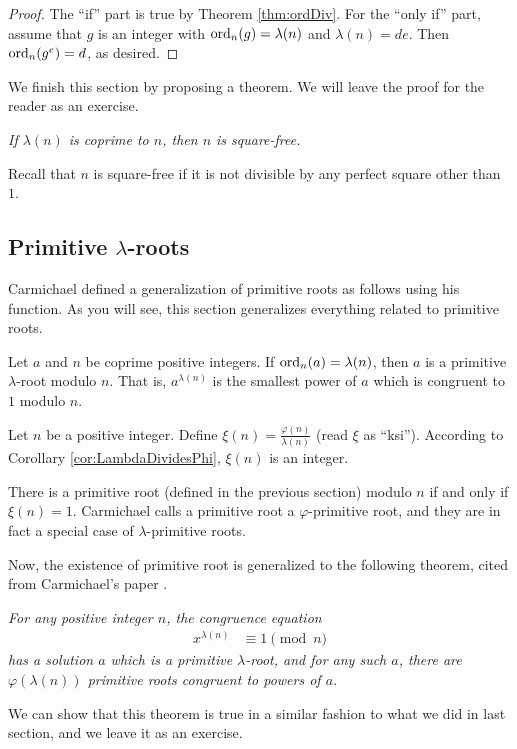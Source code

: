\documentclass{subfile}
\begin{document}
	\begin{proof}
		The ``if'' part is true by Theorem \ref{thm:ordDiv}. For the ``only if'' part, assume that $g$ is an integer with $\operatorname{ord}_n(g)=\lambda(n)$ and $\lambda(n)=de$. Then $\operatorname{ord}_n(g^e)=d$, as desired.
	\end{proof}
	
	We finish this section by proposing a theorem. We will leave the proof for the reader as an exercise.
		\begin{theorem}\slshape
			If $\lambda(n)$ is coprime to $n$, then $n$ is square-free.
		\end{theorem}
	Recall that $n$ is square-free if it is not divisible by any perfect square other than $1$.
	
	\subsection{Primitive $\lambda$-roots}
	Carmichael defined a generalization of primitive roots as follows using his function. As you will see, this section generalizes everything related to primitive roots.
	\begin{definition}
		Let $a$ and $n$ be coprime positive integers. If $\operatorname{ord}_n(a)=\lambda(n)$, then $a$ is a primitive $\lambda$-root modulo $n$. That is, $a^{\lambda(n)}$ is the smallest power of $a$ which is congruent to $1$ modulo $n$. 
	\end{definition}

	\begin{definition}
		Let $n$ be a positive integer. Define $\xi(n) = \frac{\varphi(n)}{\lambda(n)}$ (read $\xi$ as ``ksi''). According to Corollary \ref{cor:LambdaDividesPhi}, $\xi(n)$ is an integer.
	\end{definition}

	\begin{proposition}
		 There is a primitive root (defined in the previous section) modulo $n$ if and only if $\xi(n)=1$. Carmichael calls a primitive root a $\varphi$-primitive root, and they are in fact a special case of $\lambda$-primitive roots.
	\end{proposition}

	Now, the existence of primitive root is generalized to the following theorem, cited from Carmichael's paper \cite{ch:congruence-carmichael-original}.
	\begin{theorem}[Carmicahel]\slshape
		For any positive integer $n$, the congruence equation
			\begin{align*}
				x^{\lambda(n)} & \equiv1\pmod n
			\end{align*}
		has a solution $a$ which is a primitive $\lambda$-root, and for any such $a$, there are $\varphi(\lambda(n))$ primitive roots congruent to powers of $a$.
	\end{theorem}
	We can show that this theorem is true in a similar fashion to what we did in last section, and we leave it as an exercise.
	
\end{document}
